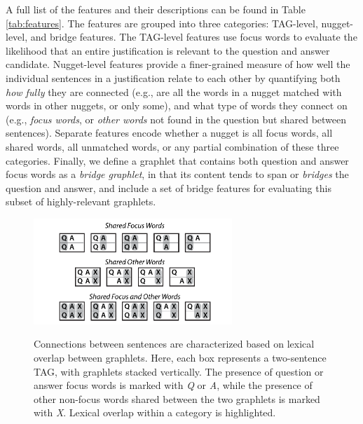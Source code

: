 A full list of the features and their descriptions can be found in Table \ref{tab:features}.
%
The features are grouped into three categories: TAG-level, nugget-level, and bridge features. 
The TAG-level features use focus words to evaluate the likelihood that an entire justification is relevant to the question and answer candidate. 
Nugget-level features provide a finer-grained measure of how well the individual sentences in a justification relate to each other by quantifying both \emph{how fully} they are connected (e.g., are all the words in a nugget matched with words in other nuggets, or only some), and what type of words they connect on (e.g., \emph{focus words}, or \emph{other words} not found in the question but shared between sentences).
Separate features encode whether a nugget is all focus words, all shared words, all unmatched words, or any partial combination of these three categories.
Finally, we define a graphlet that contains both question and answer focus words as a \emph{bridge graphlet}, in that its content tends to span or \emph{bridges} the question and answer, and include a set of bridge features for evaluating this subset of highly-relevant graphlets. 




\begin{figure}[t!]
\begin{center}
\includegraphics[width=75mm]{connection_types.pdf}
\vspace{-2mm}
\caption{{Connections between sentences are characterized based on lexical overlap between graphlets.
Here, each box represents a two-sentence TAG, with graphlets stacked vertically.  The presence of question or answer focus words is marked with \emph{Q} or \emph{A}, while the presence of other non-focus words shared between the two graphlets is marked with \emph{X}.  Lexical overlap within a category is highlighted.
}}
\vspace{-5mm}
\label{fig:connectiontypes}
\end{center}
\end{figure}


